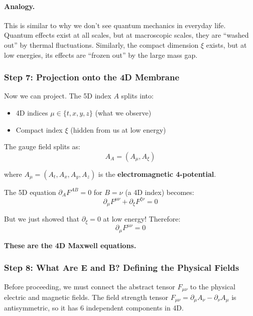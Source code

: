 \paragraph{Analogy.}

This is similar to why we don't see quantum mechanics in everyday life. Quantum effects exist at all scales, but at macroscopic scales, they are ``washed out'' by thermal fluctuations. Similarly, the compact dimension $\xi$ exists, but at low energies, its effects are ``frozen out'' by the large mass gap.

\subsubsection{Step 7: Projection onto the 4D Membrane}

Now we can project. The 5D index $A$ splits into:
\begin{itemize}
    \item 4D indices $\mu \in \{t, x, y, z\}$ (what we observe)
    \item Compact index $\xi$ (hidden from us at low energy)
\end{itemize}

The gauge field splits as:
\begin{equation}
A_A = (A_\mu, A_\xi)
\end{equation}

where $A_\mu = (A_t, A_x, A_y, A_z)$ is the \textbf{electromagnetic 4-potential}.

The 5D equation $\partial_A F^{AB} = 0$ for $B = \nu$ (a 4D index) becomes:
\begin{equation}
\partial_\mu F^{\mu\nu} + \partial_\xi F^{\xi\nu} = 0
\end{equation}

But we just showed that $\partial_\xi = 0$ at low energy! Therefore:
\begin{equation}
\boxed{\partial_\mu F^{\mu\nu} = 0}
\end{equation}

\textbf{These are the 4D Maxwell equations.}

\subsubsection{Step 8: What Are E and B? Defining the Physical Fields}

Before proceeding, we must connect the abstract tensor $F_{\mu\nu}$ to the physical electric and magnetic fields. The field strength tensor $F_{\mu\nu} = \partial_\mu A_\nu - \partial_\nu A_\mu$ is antisymmetric, so it has 6 independent components in 4D.

